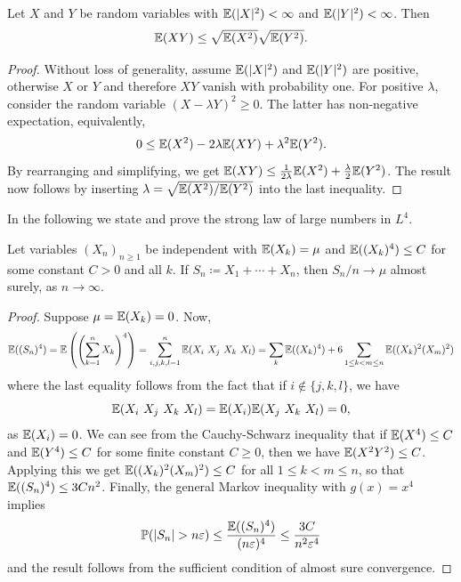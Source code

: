 \documentclass[10pt, a4paper]{article}
\begin{document}
\begin{lemma}
    Let $X$ and $Y$ be random variables with $\mathbb{E}(|X| ^ 2) < \infty$ and $\mathbb{E}(|Y| ^ 2) < \infty$.
    Then
    \[
    \mathbb{E}(XY) \leq \sqrt{\mathbb{E}(X ^ 2)}\sqrt{\mathbb{E}(Y ^ 2)}.
    \]

    \begin{proof}
        Without loss of generality,
        assume $\mathbb{E}(|X| ^ 2)$ and $\mathbb{E}(|Y| ^ 2)$ are positive,
        otherwise $X$ or $Y$ and therefore $XY$ vanish with probability one.
        For positive $\lambda$,
        consider the random variable $(X - \lambda Y) ^ 2 \geq 0$.
        The latter has non-negative expectation,
        equivalently,
        \[
        0 \leq \mathbb{E}(X ^ 2) - 2\lambda\mathbb{E}(XY) + \lambda ^ 2\mathbb{E}(Y ^ 2).
        \]
        By rearranging and simplifying,
        we get $\mathbb{E}(XY) \leq \frac{1}{2\lambda}\mathbb{E}(X ^ 2) + \frac{\lambda}{2}\mathbb{E}(Y ^ 2)$.
        The result now follows by inserting $\lambda = \sqrt{\mathbb{E}(X ^ 2) / \mathbb{E}(Y ^ 2)}$ into the last inequality.
    \end{proof}
\end{lemma}

In the following we state and prove the strong law of large numbers in $L ^ 4$.
\begin{theorem}[$L ^ 4$-SLLN]
    Let variables $(X_n)_{n \geq 1}$ be independent with $\mathbb{E}(X_k) = \mu$ and $\mathbb{E}((X_k) ^ 4) \leq C$ for some constant $C > 0$ and all $k$.
    If $S_n \coloneqq X_1 + \dotsi + X_n$,
    then $S_n / n \to \mu$ almost surely,
    as $n \to \infty$.

    \begin{proof}
        Suppose $\mu = \mathbb{E}(X_k) = 0$.
        Now,
        \[
        \mathbb{E}((S_n) ^ 4) = \mathbb{E}\left(\left(\sum_{k = 1}^{n}X_k\right) ^ 4\right) = \sum_{i, j, k, l = 1}^{n}\mathbb{E}(X_i\ X_j\ X_k\ X_l) = \sum_{k}\mathbb{E}((X_k) ^ 4) + 6\sum_{1 \leq k < m \leq n}\mathbb{E}((X_k) ^ 2(X_m) ^ 2)
        \]
        where the last equality follows from the fact that if $i \notin \{j, k, l\}$,
        we have
        \[
        \mathbb{E}(X_i\ X_j\ X_k\ X_l) = \mathbb{E}(X_i)\mathbb{E}(X_j\ X_k\ X_l) = 0,
        \]
        as $\mathbb{E}(X_i) = 0$.
        We can see from the Cauchy-Schwarz inequality that if $\mathbb{E}(X ^ 4) \leq C$ and $\mathbb{E}(Y ^ 4) \leq C$ for some finite constant $C \geq 0$,
        then we have $\mathbb{E}(X ^ 2Y ^ 2) \leq C$.
        Applying this we get $\mathbb{E}((X_k) ^ 2(X_m) ^ 2) \leq C$ for all $1 \leq k < m \leq n$,
        so that $\mathbb{E}((S_n) ^ 4) \leq 3Cn ^ 2$.
        Finally,
        the general Markov inequality with $g(x) = x ^ 4$ implies
        \[
        \mathbb{P}(|S_n| > n\varepsilon) \leq \frac{\mathbb{E}((S_n) ^ 4)}{(n\varepsilon) ^ 4} \leq \frac{3C}{n ^ 2\varepsilon ^ 4}
        \]
        and the result follows from the sufficient condition of almost sure convergence.
    \end{proof}
\end{theorem}
\end{document}
